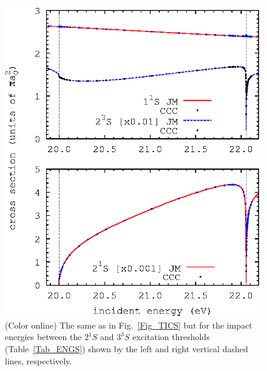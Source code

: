 \documentclass[aip
, pra
, showpacs
, aps
, twocolumn
, groupedaddress
, floatfix
]{revtex4}
\begin{document}
\begin{figure}[htb]
\includegraphics[scale=1]{fig_res_2S1.ps}
\caption{(Color online) The same as in Fig.~\ref{Fig_TICS}
but for the impact energies between the $2^1S$ and $3^3S$ excitation thresholds (Table~\ref{Tab_ENGS}) shown by the left and right vertical dashed lines, respectively.
}
\label{Fig_2S1}
\end{figure}
\end{document}
